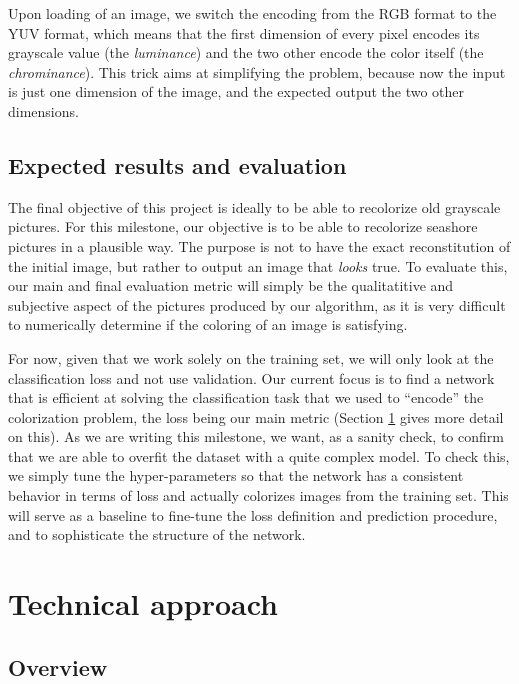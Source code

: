\documentclass[10pt,twocolumn,letterpaper]{article}
\begin{document}
Upon loading of an image, we switch the encoding from the RGB format to the YUV format, which means that the first dimension of every pixel encodes its grayscale value (the \textit{luminance}) and the two other encode the color itself (the \textit{chrominance}). This trick aims at simplifying the problem, because now the input is just one dimension of the image, and the expected output the two other dimensions.

\subsection{Expected results and evaluation}


The final objective of this project is ideally to be able to recolorize old grayscale pictures. For this milestone, our objective is to be able to recolorize seashore pictures in a plausible way. The purpose is not to have the exact reconstitution of the initial image, but rather to output an image that \textit{looks} true. To evaluate this, our main and final evaluation metric will simply be the qualitatitive and subjective aspect of the pictures produced by our algorithm, as it is very difficult to numerically determine if the coloring of an image is satisfying.

For now, given that we work solely on the training set, we will only look at the classification loss and not use validation. Our current focus is to find a network that is efficient at solving the classification task that we used to ``encode'' the colorization problem, the loss being our main metric (Section \ref{overview} gives more detail on this). As we are writing this milestone, we want, as a sanity check, to confirm that we are able to overfit the dataset with a quite complex model. To check this, we simply tune the hyper-parameters so that the network has a consistent behavior in terms of loss and actually colorizes images from the training set.
This will serve as a baseline to fine-tune the loss definition and prediction procedure, and to sophisticate the structure of the network.

\section{Technical approach} \label{overview}

\subsection{Overview}
\end{document}
